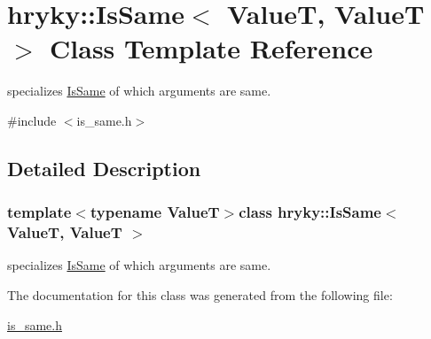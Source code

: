 \hypertarget{classhryky_1_1_is_same_3_01_value_t_00_01_value_t_01_4}{\section{hryky\-:\-:Is\-Same$<$ Value\-T, Value\-T $>$ Class Template Reference}
\label{classhryky_1_1_is_same_3_01_value_t_00_01_value_t_01_4}
}


specializes \hyperlink{classhryky_1_1_is_same}{Is\-Same} of which arguments are same.  




{\ttfamily \#include $<$is\-\_\-same.\-h$>$}



\subsection{Detailed Description}
\subsubsection*{template$<$typename Value\-T$>$class hryky\-::\-Is\-Same$<$ Value\-T, Value\-T $>$}

specializes \hyperlink{classhryky_1_1_is_same}{Is\-Same} of which arguments are same. 

The documentation for this class was generated from the following file\-:\begin{DoxyCompactItemize}
\item 
\hyperlink{is__same_8h}{is\-\_\-same.\-h}\end{DoxyCompactItemize}
